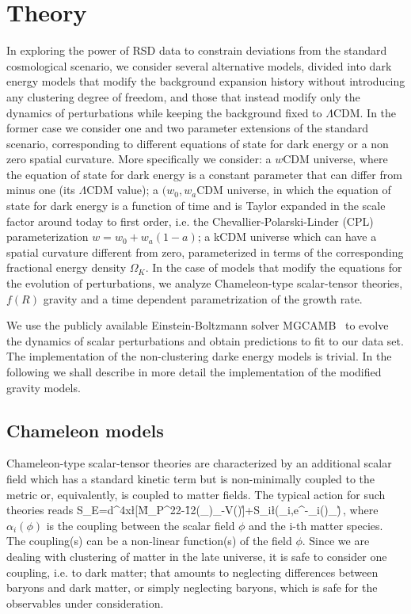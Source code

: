 \section{Theory}
\label{sec:theory}
In exploring the power of RSD data to constrain deviations from the standard cosmological scenario,  we consider several alternative models,  divided into dark energy models that modify the background expansion history without introducing any clustering degree of freedom, and those that instead modify only the dynamics of perturbations while keeping the background fixed to $\Lambda$CDM.  In the former case we consider one and two parameter extensions of the standard scenario, corresponding to different equations of state for dark energy or a non zero spatial curvature. More specifically we consider: a $w$CDM universe, where the equation of state for dark energy is a constant parameter that can differ from minus one (its $\Lambda$CDM value); a $(w_0,w_a$CDM universe, in which the equation of state for dark energy is a function of time and is Taylor expanded  in the scale factor around today to first order, i.e.  the Chevallier-Polarski-Linder (CPL) parameterization $w=w_0+w_a(1-a)$; a kCDM universe which can have a spatial curvature different from zero, parameterized in terms of the corresponding fractional energy density $\Omega_{K}$. In the case of models that modify the equations for the evolution of perturbations, we analyze Chameleon-type scalar-tensor theories, $f(R)$ gravity and a time dependent parametrization of the growth rate. 

We use the publicly available Einstein-Boltzmann solver MGCAMB~\cite{CAMB} to evolve the dynamics of scalar perturbations and obtain predictions to fit to our data set. The implementation of the non-clustering darke energy models is trivial. In the following we shall describe in more detail the implementation of the modified gravity models. 

\subsection{Chameleon models}
Chameleon-type scalar-tensor theories are characterized by  an additional scalar field which has a standard kinetic term but is non-minimally coupled to the metric or, equivalently, is coupled to matter fields. The typical action for such theories reads
\be\label{Einstein_action_text}
S_E=\int d^4x\l[\f{M_P^2}{2}-\f{1}{2}(\tilde{\nabla}_{\mu}\phi)\tilde{\nabla}_{\nu}\phi-V(\phi)\r]+S_i\l(\chi_i,e^{-\kappa\alpha_i(\phi)}_{\mu\nu}\r)\,,
\ee
where $\alpha_i(\phi)$ is the coupling between the scalar field $\phi$ and the i-th matter species. The coupling(s) can be a non-linear function(s) of the field $\phi$. Since we are dealing with clustering of matter in the late universe, it is safe to consider one coupling, i.e. to dark matter; that amounts to neglecting differences between baryons and dark matter, or simply neglecting baryons, which is safe for the observables under consideration. 

